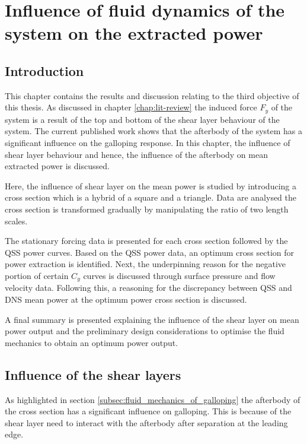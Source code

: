 \chapter{Influence of fluid dynamics of the system on the extracted power}

\section{Introduction}

This chapter contains the results and discussion relating to the third objective of this thesis. As discussed in chapter \ref{chap:lit-review} the induced force $F_y$ of the system is a result of the top and bottom of the shear layer behaviour of the system. The current published work shows that the afterbody of the system has a significant influence on the galloping response. In this chapter, the influence of shear layer behaviour and hence, the influence of the afterbody on mean extracted power is discussed.

Here, the influence of shear layer on the mean power is studied by introducing a cross section which is a hybrid of a square and a triangle. Data are analysed the cross section is transformed gradually by manipulating the ratio of two length scales.

The stationary forcing data is presented for each cross section followed by the QSS power curves. Based on the QSS power data, an optimum cross section for power extraction is identified. Next, the underpinning reason for the negative portion of certain $C_y$ curves is discussed through surface pressure and flow velocity data. Following this, a reasoning for the discrepancy between QSS and DNS mean power at the optimum power cross section is discussed.       

A final summary is presented explaining the influence of the shear layer on mean power output and the preliminary design considerations to optimise the fluid mechanics to obtain an optimum power output. 


\section{Influence of the shear layers}

As highlighted in section \ref{subsec:fluid_mechanics_of_galloping} the afterbody of the cross section has a significant influence on galloping. This is because of the shear layer need to interact with the afterbody after separation at the leading edge. 


